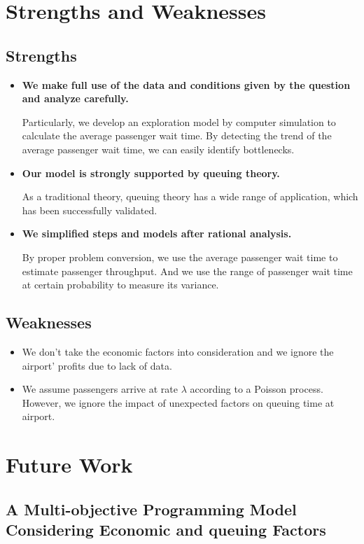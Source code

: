 \documentclass{mcmthesis}
\begin{document}
\section{Strengths and Weaknesses}
\subsection{Strengths}
\begin{itemize} 
\item \textbf{We make full use of the data and conditions given by the question and analyze carefully.}
\par Particularly, we develop an exploration model by computer simulation to calculate the average passenger wait time. By detecting the trend of the average passenger wait time, we can easily identify bottlenecks.
\item \textbf{Our model is strongly supported by queuing theory.}
\par As a traditional theory, queuing theory has a wide range of application, which has been successfully validated.

\item \textbf{We simplified steps and models after rational analysis.} 
\par By proper problem conversion, we use the average passenger wait time to estimate passenger throughput. And we use the range of passenger wait time at certain probability to measure its variance.
\end{itemize}
\subsection{Weaknesses}
\begin{itemize}
	\item We don’t take the economic factors into consideration and we ignore the airport’ profits due to lack of data.
	\item We assume passengers arrive at rate $\lambda$ according to a Poisson process. However, we ignore the impact of unexpected factors on queuing time at airport.
\end{itemize}


\section{Future Work}
\subsection*{A Multi-objective Programming Model Considering Economic and queuing Factors}
\end{document}
